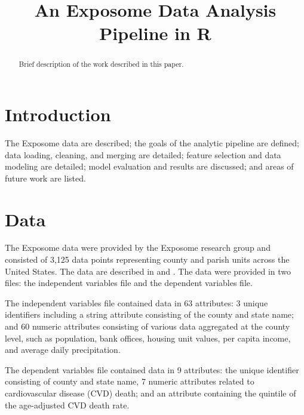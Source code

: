 \documentclass[conference,compsoc]{IEEEtran}
\begin{document}
\title{An Exposome Data Analysis Pipeline in R}

\author{
}

\maketitle

\begin{abstract}
Brief description of the work described in this paper.
\end{abstract}

\section{Introduction}

The Exposome data are described; the goals of the analytic pipeline are defined; data loading,
cleaning, and merging are detailed; feature selection and data modeling are detailed; model evaluation and results are discussed;
and areas of future work are listed.

\section{Data}

The Exposome data were provided by the Exposome research group and consisted of 3,125 data points representing county and parish units across the
United States. The data are described in \cite{kershenbaum} and \cite{juarez}. The data were provided in two files: the independent variables file and the dependent variables file.

The independent variables file contained data in 63 attributes: 3 unique identifiers including a string attribute consisting of the county and state name;
and 60 numeric attributes consisting of various data aggregated at the county level, such as population, bank offices, housing unit values, per capita income,
and average daily precipitation.

The dependent variables file contained data in 9 attributes: the unique identifier consisting of county and state name, 7 numeric attributes related to cardiovascular
disease (CVD) death; and an attribute containing the quintile of the age-adjusted CVD death rate.
\end{document}
